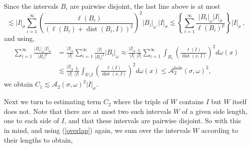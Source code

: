 \documentclass{amsart}%
\theoremstyle{plain}
\numberwithin{equation}{section}
\begin{document}
Since the intervals $B_{i}$ are pairwise disjoint, the last line above is at
most%
\[
\lesssim\left\vert I\right\vert _{\sigma}\sum_{i=1}^{\infty}\left(  \frac
{\ell\left(  B_{i}\right)  }{\left(  \ell\left(  B_{i}\right)
+\operatorname*{dist}\left(  B_{i},I\right)  \right)  ^{2}}\right)
^{2}\left\vert B_{i}\right\vert _{\omega}\ \left\vert I\right\vert _{\sigma
}\lesssim\left\{  \sum_{i=1}^{\infty}\frac{\left\vert B_{i}\right\vert
_{\omega}\left\vert I\right\vert _{\sigma}}{\ell\left(  B_{i}\right)  ^{p}%
}\right\}  \left\vert I\right\vert _{\sigma}\ ,
\]
and using,
\begin{align*}
\sum_{i=1}^{\infty}\frac{\left\vert B_{i}\right\vert _{\omega}\left\vert
I\right\vert _{\sigma}}{\left\vert B_{i}\right\vert ^{p}}  & =\frac{\left\vert
I\right\vert _{\sigma}}{\left\vert I\right\vert }\sum_{i=1}^{\infty}%
\frac{\left\vert I\right\vert }{\left\vert B_{i}\right\vert ^{2}}\left\vert
B_{i}\right\vert _{\omega}\approx\frac{\left\vert I\right\vert _{\sigma}%
}{\left\vert I\right\vert }\frac{1}{\left\vert I\right\vert }\sum
_{i=1}^{\infty}\int_{B_{i}}\left(  \frac{\ell\left(  I\right)  }%
{\operatorname*{dist}\left(  x,I\right)  }\right)  ^{2}d\omega\left(
x\right)  \\
& \lesssim\frac{\left\vert I\right\vert _{\sigma}}{\left\vert I\right\vert
}\frac{1}{\left\vert I\right\vert }\int_{\mathbb{R}\setminus I}\left(
\frac{\ell\left(  I\right)  }{\operatorname*{dist}\left(  x,I\right)
}\right)  ^{2}d\omega\left(  x\right)  \leq\mathcal{A}_{2}%
^{\operatorname*{hole}}\left(  \sigma,\omega\right)  ^{2},
\end{align*}
we obtain $C_{1}\lesssim\mathcal{A}_{2}\left(  \sigma,\omega\right)
^{2}\left\vert I\right\vert _{\sigma}$.

Next we turn to estimating term $C_{2}$ where the triple of $W$ contains $I$
but $W$ itself does not. Note that there are at most two such intervals $W$ of
a given side length, one to each side of $I$, and that these intervals are
pairwise disjoint. So with this in mind, and using (\ref{overlap}) again, we
sum over the intervals $W$ according to their lengths to obtain,%
\end{document}
